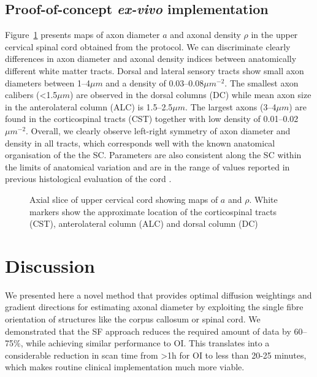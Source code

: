 \subsection{Proof-of-concept \emph{ex-vivo} implementation}
Figure~\ref{fig:chapter7 exp1 monkey data} presents maps of axon diameter $a$ and axonal density $\rho$ in the upper cervical spinal cord obtained from the {\FD} protocol. We can discriminate clearly differences in axon diameter and axonal density indices between anatomically different white matter tracts. Dorsal and lateral sensory tracts show small axon diameters between 1--4$\mu m$ and a density of 0.03--0.08$\mu m^{-2}$. The smallest axon calibers (<1.5$\mu m$) are observed in the dorsal columns (DC) while mean axon size in the anterolateral column (ALC) is 1.5--2.5$\mu m$. The largest axons (3--4$\mu m$) are found in the corticospinal tracts (CST) together with low density of 0.01--0.02$\mu m^{-2}$. Overall, we clearly observe left-right symmetry of axon diameter and density in all tracts, which corresponds well with the known anatomical organisation of the the SC. Parameters are also consistent along the SC within the limits of anatomical variation and are in the range of values reported in previous histological evaluation of the cord \citep{GrafvonKeyserlingk:1984,Golabchi:2010}. 

\begin{figure}[ht]
	\centering
	\hspace{2cm}
	\caption{Axial slice of upper cervical cord showing maps of $a$ and $\rho$. White markers show the approximate location of the corticospinal tracts (CST), anterolateral column (ALC) and dorsal column (DC)}
	\label{fig:chapter7 exp1 monkey data}
\end{figure}

\section{Discussion}
We presented here a novel method that provides optimal diffusion weightings and gradient directions for estimating axonal diameter by exploiting the single fibre orientation of structures like the corpus callosum or spinal cord. We demonstrated that the {\gls{SF}} approach reduces the required amount of data by 60--75\%, while achieving similar performance to {\gls{OI}}. This translates into a considerable reduction in scan time from >1h for {\gls{OI}} to less than 20-25 minutes, which makes routine clinical implementation much more viable.  

